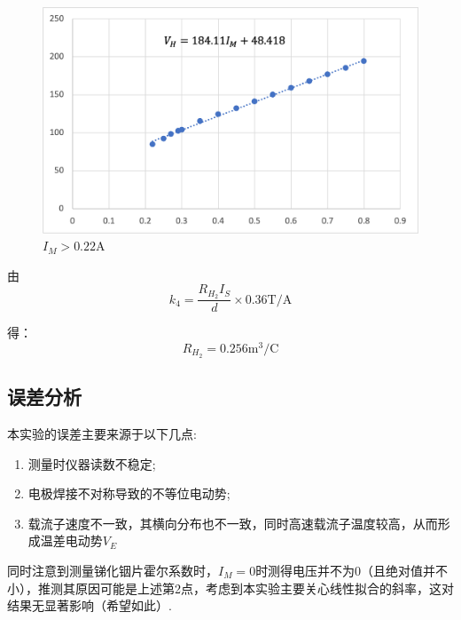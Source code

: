 \documentclass[UTF8]{ctexart}
\begin{document}
\begin{figure}[h]
  \centering
  \includegraphics[scale=0.7]{p7.png}
  \caption{$I_M>0.22\mathrm{A}$}
\end{figure}

由
\[k_4 = \frac{R_{H_2}I_S}{d}\times 0.36\mathrm{T/A}\]

得：
\[R_{H_2} = 0.256\mathrm{m^3/C}\]

\subsection{误差分析}
本实验的误差主要来源于以下几点:
\begin{enumerate}
  \item 测量时仪器读数不稳定;
  \item 电极焊接不对称导致的不等位电动势;
  \item 载流子速度不一致，其横向分布也不一致，同时高速载流子温度较高，从而形成温差电动势$V_E$
\end{enumerate}

同时注意到测量锑化铟片霍尔系数时，$I_M=0$时测得电压并不为0（且绝对值并不小），推测其原因可能是上述第2点，考虑到本实验主要关心线性拟合的斜率，这对结果无显著影响（希望如此）.

\end{document}

